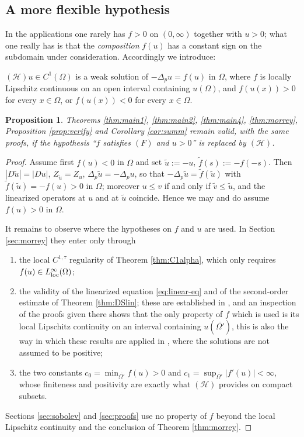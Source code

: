 \documentclass[reqno]{amsart}
\theoremstyle{plain}
\newtheorem{proposition}[theorem]{Proposition}
\theoremstyle{definition}
\theoremstyle{remark}
\begin{document}
\subsection{A more flexible hypothesis}
In the applications one rarely has $f>0$ on $(0,\infty)$ together with $u>0$; what one really has
is that the \emph{composition} $f(u)$ has a constant sign on the subdomain under consideration.
Accordingly we introduce:

\medskip
\noindent$(\mathcal H)$\quad $u\in C^1(\Omega)$ is a weak solution of $-\Delta_pu=f(u)$ in
$\Omega$, where $f$ is locally Lipschitz continuous on an open interval containing
$u(\Omega)$, and $f(u(x))>0$ for every $x\in\Omega$, or $f(u(x))<0$ for every $x\in\Omega$.
\medskip

\begin{proposition}\label{prop:H}
Theorems \ref{thm:main1}, \ref{thm:main2}, \ref{thm:main4}, \ref{thm:morrey}, Proposition
\ref{prop:verify} and Corollary \ref{cor:summ} remain valid, with the same proofs, if the hypothesis
``$f$ satisfies $(F)$ and $u>0$'' is replaced by $(\mathcal H)$.
\end{proposition}

\begin{proof}
Assume first $f(u)<0$ in $\Omega$ and set $\widetilde u:=-u$, $\widetilde f(s):=-f(-s)$. Then
$|D\widetilde u|=|Du|$, $Z_{\widetilde u}=Z_u$,
$\Delta_p\widetilde u=-\Delta_p u$, so that $-\Delta_p\widetilde u=\widetilde f(\widetilde u)$ with
$\widetilde f(\widetilde u)=-f(u)>0$ in $\Omega$; moreover $u\le v$ if and only if
$\widetilde v\le\widetilde u$, and the linearized operators at $u$ and at $\widetilde u$ coincide.
Hence we may and do assume $f(u)>0$ in $\Omega$.

It remains to observe where the hypotheses on $f$ and $u$ are used. In Section \ref{sec:morrey}
they enter only through
\begin{enumerate}[label=\rm(\roman*),leftmargin=2.2em]
\item the local $C^{1,\tau}$ regularity of Theorem \ref{thm:C1alpha}, which only requires
$f(u)\in L^\infty_{\rm loc}(\Omega)$;
\item the validity of the linearized equation \eqref{eq:linear-eq} and of the second-order estimate
of Theorem \ref{thm:DSlin}; these are established in \cite[Theorem 1.1 and (1.2)]{DS1}, and an
inspection of the proofs given there shows that the only property of $f$ which is used is its local
Lipschitz continuity on an interval containing $u(\overline{\Omega'})$, this is also the way in
which these results are applied in \cite{EFMS1,EFMS2}, where the solutions are not assumed to be
positive;
\item the two constants $c_0=\min_{\overline{\Omega'}}f(u)>0$ and
$c_1=\sup_{\overline{\Omega'}}|f'(u)|<\infty$, whose finiteness and positivity are exactly what
$(\mathcal H)$ provides on compact subsets.
\end{enumerate}
Sections \ref{sec:sobolev} and \ref{sec:proofs} use no property of $f$ beyond the local Lipschitz
continuity and the conclusion of Theorem \ref{thm:morrey}.
\end{proof}
\end{document}
